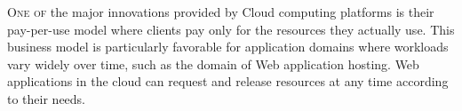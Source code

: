 



\lettrine{O}{ne of} the major innovations provided by Cloud computing
platforms is their pay-per-use model where clients pay only for the
resources they actually use. This business model is particularly
favorable for application domains where workloads vary widely over
time, such as the domain of Web application hosting. Web applications
in the cloud can request and release resources at any time according
to their needs.


